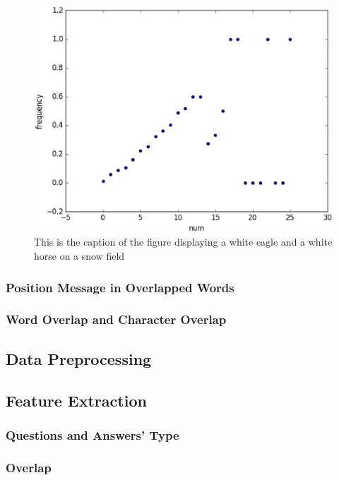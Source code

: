 \documentclass{llncs}
\begin{document}
\begin{figure}
\vspace{2.5cm}
\centering
\includegraphics[width=5in]{figures/word_overlap.eps}
\caption{This is the caption of the figure displaying a white eagle and
a white horse on a snow field}
\label{fig:word_overlap}
\end{figure}



\subsubsection{Position Message in Overlapped Words}

\subsubsection{Word Overlap and Character Overlap}

\subsection{Data Preprocessing}

\subsection{Feature Extraction}
\subsubsection{Questions and Answers’ Type}
\subsubsection{Overlap}
\end{document}

